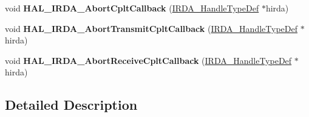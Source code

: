 \begin{DoxyCompactItemize}
\item 
\mbox{\label{group___i_r_d_a___exported___functions___group2_ga776defd56d6ce3702591bd27a2607555}} 
void {\bfseries H\+A\+L\+\_\+\+I\+R\+D\+A\+\_\+\+Abort\+Cplt\+Callback} (\hyperlink{struct_i_r_d_a___handle_type_def}{I\+R\+D\+A\+\_\+\+Handle\+Type\+Def} $\ast$hirda)
\item 
\mbox{\label{group___i_r_d_a___exported___functions___group2_ga621b474e56691c0882531ccf8166ec05}} 
void {\bfseries H\+A\+L\+\_\+\+I\+R\+D\+A\+\_\+\+Abort\+Transmit\+Cplt\+Callback} (\hyperlink{struct_i_r_d_a___handle_type_def}{I\+R\+D\+A\+\_\+\+Handle\+Type\+Def} $\ast$hirda)
\item 
\mbox{\label{group___i_r_d_a___exported___functions___group2_ga0480aa5bdb1380502e4edad73d3471a1}} 
void {\bfseries H\+A\+L\+\_\+\+I\+R\+D\+A\+\_\+\+Abort\+Receive\+Cplt\+Callback} (\hyperlink{struct_i_r_d_a___handle_type_def}{I\+R\+D\+A\+\_\+\+Handle\+Type\+Def} $\ast$hirda)
\end{DoxyCompactItemize}


\subsection{Detailed Description}
